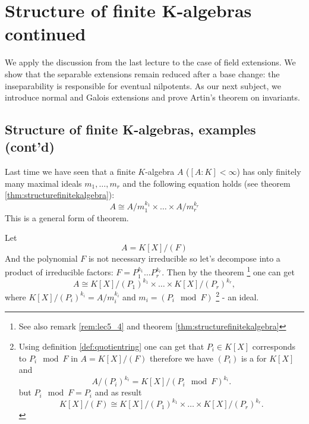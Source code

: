 \chapter{Structure of finite K-algebras continued}

We apply the discussion from the last lecture to the case of field
extensions. We show that the separable extensions remain reduced after
a base change: the inseparability is responsible for eventual
nilpotents. As our next subject, we introduce normal and Galois
extensions and prove Artin's theorem on invariants.

\section{Structure of finite K-algebras, examples (cont'd)}

Last time we have seen that a finite $K$-algebra $A$
($\left[A:K\right] < \infty$) has only finitely many maximal ideals
$m_1, \dots, m_r$ and the following equation holds (see theorem
\ref{thm:structurefinitekalgebra}):
\[
A \cong A/m_1^{k_1} \times \dots \times A/m_r^{k_r}
\]
This is a general form of  theorem.

\begin{example}
  Let
  \[
  A = K\left[X\right]/\left(F\right)
  \]
  And the polynomial $F$ is not necessary
  irreducible so let's decompose into a product of irreducible
  factors:  $F= P_1^{k_1} \dots P_r^{k_r}$.
  Then by the   theorem
  \footnote{
    See also remark \ref{rem:lec5_4} and theorem
    \ref{thm:structurefinitekalgebra}
  }
  one can get
  \[
  A \cong
  K\left[X\right]/\left(P_1\right)^{k_1} \times \dots
  \times K\left[X\right]/\left(P_r\right)^{k_r},
  \]
  where $K\left[X\right]/\left(P_i\right)^{k_i} = A/m_i^{k_i}$ and
  $m_i = \left( P_i \mod F \right)$
  \footnote{
    Using definition \ref{def:quotientring} one can get that
    $P_i \in K\left[X\right]$ corresponds to
    $P_i \mod F$ in $A = K\left[X\right]/\left(F\right)$ therefore 
    we have $\left(P_i\right)$ is a  for
    $K\left[X\right]$ and 
    \[
    A/\left(P_i\right)^{k_i} =
    K\left[X\right]/\left(P_i \mod F \right)^{k_i}.
    \]
    but $P_i \mod F  = P_i$ and as result
    \[
    K\left[X\right]/\left(F\right) \cong
    K\left[X\right]/\left(P_1\right)^{k_1} \times \dots
    \times K\left[X\right]/\left(P_r\right)^{k_r}.
    \]
  }
  - an ideal.
  \label{ex:lec5_1}
\end{example}

